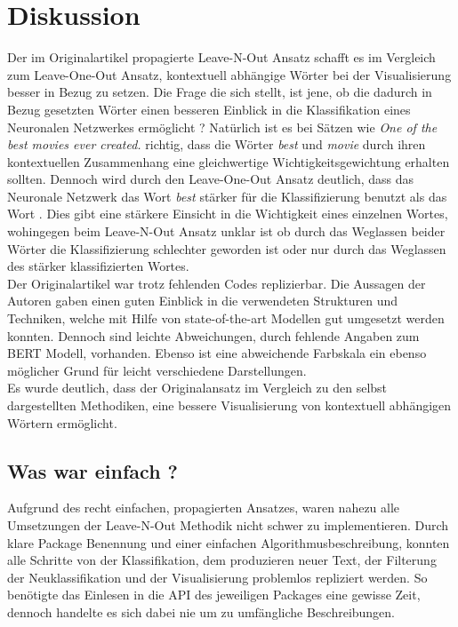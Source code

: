 \documentclass[DIV=13,fontsize=11pt]{scrartcl}
\begin{document}
\section{Diskussion}
Der im Originalartikel propagierte Leave-N-Out Ansatz schafft es im Vergleich zum Leave-One-Out Ansatz, kontextuell abhängige
Wörter bei der Visualisierung besser in Bezug zu setzen. Die Frage die sich stellt, ist jene, ob die dadurch in Bezug gesetzten Wörter einen besseren
Einblick in die Klassifikation eines Neuronalen Netzwerkes ermöglicht ? Natürlich ist es bei Sätzen wie \textit{One of the best movies ever created.} richtig,
dass die Wörter \textit{best} und \textit{movie} durch ihren kontextuellen Zusammenhang eine gleichwertige Wichtigkeitsgewichtung erhalten sollten.
Dennoch wird durch den Leave-One-Out Ansatz deutlich, dass das Neuronale Netzwerk das Wort \textit{best} stärker für die Klassifizierung benutzt
als das Wort . Dies gibt eine stärkere Einsicht in die Wichtigkeit eines einzelnen Wortes, wohingegen beim Leave-N-Out Ansatz
unklar ist ob durch das Weglassen beider Wörter die Klassifizierung schlechter geworden ist oder nur durch das Weglassen des stärker klassifizierten Wortes.\\

Der Originalartikel war trotz fehlenden Codes replizierbar. Die Aussagen der Autoren gaben einen guten Einblick in die verwendeten Strukturen und Techniken,
welche mit Hilfe von state-of-the-art Modellen gut umgesetzt werden konnten. Dennoch sind leichte Abweichungen, durch fehlende Angaben zum
BERT Modell, vorhanden. Ebenso ist eine abweichende Farbskala ein ebenso möglicher Grund für leicht verschiedene Darstellungen.\\

Es wurde deutlich, dass der Originalansatz im Vergleich zu den selbst dargestellten Methodiken, eine bessere Visualisierung von kontextuell
abhängigen Wörtern ermöglicht.

\subsection{Was war einfach ?}
Aufgrund des recht einfachen, propagierten Ansatzes, waren nahezu alle Umsetzungen der Leave-N-Out Methodik nicht schwer zu implementieren.
Durch klare Package Benennung und einer einfachen Algorithmusbeschreibung, konnten alle Schritte von der Klassifikation, dem produzieren neuer Text,
der Filterung der Neuklassifikation und der Visualisierung problemlos repliziert werden. So benötigte das Einlesen in die API des jeweiligen
Packages eine gewisse Zeit, dennoch handelte es sich dabei nie um zu umfängliche Beschreibungen.\\
\end{document}
